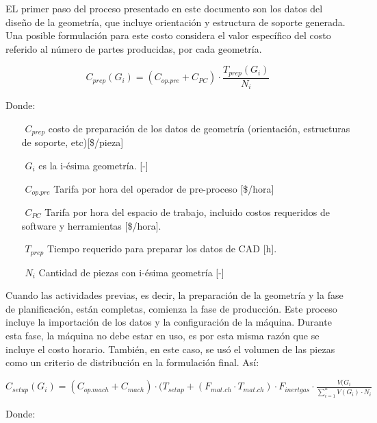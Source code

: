 \begin{description}
EL primer paso del proceso presentado en este documento son los datos del diseño de la geometría, que incluye orientación y estructura de soporte generada. Una posible formulación para este costo considera el valor específico del costo referido al número de partes producidas, por cada geometría.  

$$C_{prep}(G_i)=(C_{op.pre}+C_{PC})\cdot \frac{T_{prep}(G_i)}{N_i}$$

Donde:

\begin{itemize}
\item[$ $] $C_{prep} $ costo de preparación de los datos de geometría (orientación, estructuras de soporte, etc)[\$/pieza] 
\item[$ $] $G_i $ es la i-ésima geometría. [-]
\item[$ $] $C_{op.pre} $ Tarifa por hora del operador de pre-proceso  [\$/hora]
\item[$ $] $C_{PC} $ Tarifa por hora del espacio de trabajo, incluido costos requeridos de software y herramientas [\$/hora].
\item[$ $] $T_{prep} $ Tiempo requerido para preparar los datos de CAD [h].
\item[$ $] $N_i$ Cantidad de piezas con i-ésima geometría [-]
\end{itemize}

Cuando las actividades previas, es decir, la preparación de la geometría y la fase de planificación, están completas, comienza la fase de producción. Este proceso incluye la importación de los datos y la configuración de la máquina. Durante esta fase, la máquina no debe estar en uso, es por esta misma razón que se incluye el costo horario. También, en este caso, se usó el volumen de las piezas como un criterio de distribución en la formulación final. Así:


$C_{setup}(G_i)=(C_{op.mach}+C_{mach})\cdot(T_{setup}+(F_{mat.ch}\cdot T_{mat.ch})\cdot F_{inertgas}\cdot \frac{V(G_i}{\sum_{i=1}^{n} V(G_i)\cdot N_i}$

Donde:


\end{description}
